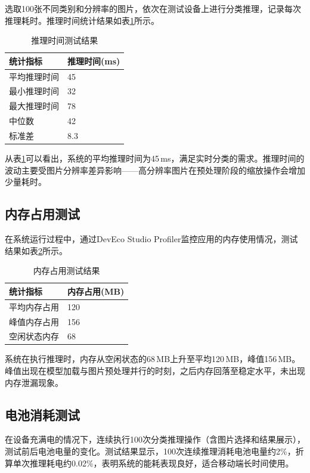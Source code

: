 选取100张不同类别和分辨率的图片，依次在测试设备上进行分类推理，记录每次推理耗时。推理时间统计结果如表\ref{tab:infer-time}所示。

\begin{table}[htbp]
\centering
\caption{推理时间测试结果}
\label{tab:infer-time}
\begin{tabular}{ll}
\toprule
统计指标 & 推理时间(ms) \\
\midrule
平均推理时间 & 45 \\
最小推理时间 & 32 \\
最大推理时间 & 78 \\
中位数 & 42 \\
标准差 & 8.3 \\
\bottomrule
\end{tabular}
\end{table}

从表\ref{tab:infer-time}可以看出，系统的平均推理时间为45\,ms，满足实时分类的需求。推理时间的波动主要受图片分辨率差异影响——高分辨率图片在预处理阶段的缩放操作会增加少量耗时。

\subsection{内存占用测试}

在系统运行过程中，通过DevEco Studio Profiler监控应用的内存使用情况，测试结果如表\ref{tab:mem-test}所示。

\begin{table}[htbp]
\centering
\caption{内存占用测试结果}
\label{tab:mem-test}
\begin{tabular}{ll}
\toprule
统计指标 & 内存占用(MB) \\
\midrule
平均内存占用 & 120 \\
峰值内存占用 & 156 \\
空闲状态内存 & 68 \\
\bottomrule
\end{tabular}
\end{table}

系统在执行推理时，内存从空闲状态的68\,MB上升至平均120\,MB，峰值156\,MB。峰值出现在模型加载与图片预处理并行的时刻，之后内存回落至稳定水平，未出现内存泄漏现象。

\subsection{电池消耗测试}

在设备充满电的情况下，连续执行100次分类推理操作（含图片选择和结果展示），测试前后电池电量的变化。测试结果显示，100次连续推理消耗电池电量约2\%，折算单次推理耗电约0.02\%，表明系统的能耗表现良好，适合移动端长时间使用。

